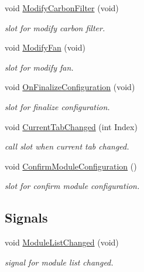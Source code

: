 \begin{DoxyCompactItemize}
void \hyperlink{classSystemTracking_1_1CLaSystem_a24cee1d11711620cbe569496f8d2e93d}{\-Modify\-Carbon\-Filter} (void)
\begin{DoxyCompactList}\small\item\em slot for modify carbon filter. \end{DoxyCompactList}\item 
void \hyperlink{classSystemTracking_1_1CLaSystem_abcff5dd06f6cf0e5705156c1d799471a}{\-Modify\-Fan} (void)
\begin{DoxyCompactList}\small\item\em slot for modify fan. \end{DoxyCompactList}\item 
void \hyperlink{classSystemTracking_1_1CLaSystem_a052aa671836d879602d27c97b04b9cda}{\-On\-Finalize\-Configuration} (void)
\begin{DoxyCompactList}\small\item\em slot for finalize configuration. \end{DoxyCompactList}\item 
void \hyperlink{classSystemTracking_1_1CLaSystem_a2c6615616a695b6b774b8215ec5762d2}{\-Current\-Tab\-Changed} (int \-Index)
\begin{DoxyCompactList}\small\item\em call slot when current tab changed. \end{DoxyCompactList}\item 
void \hyperlink{classSystemTracking_1_1CLaSystem_a90b428f0527c1324e32821aba97a205a}{\-Confirm\-Module\-Configuration} ()
\begin{DoxyCompactList}\small\item\em slot for confirm module configuration. \end{DoxyCompactList}\end{DoxyCompactItemize}
\subsection*{\-Signals}
\begin{DoxyCompactItemize}
\item 
void \hyperlink{classSystemTracking_1_1CLaSystem_af88f6b9067ed71f3fa9e0af30c1aca52}{\-Module\-List\-Changed} (void)
\begin{DoxyCompactList}\small\item\em signal for module list changed. \end{DoxyCompactList}\end{DoxyCompactItemize}
